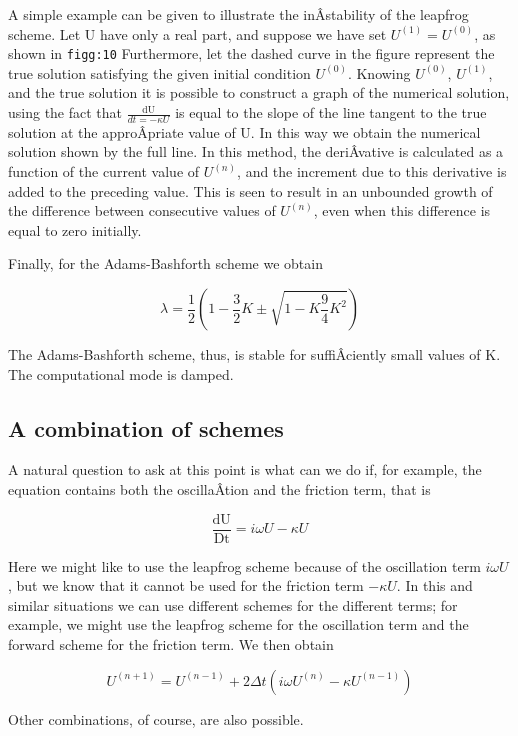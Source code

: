 A simple example can be given to illustrate the inÂ­stability of the
leapfrog scheme. Let U have only a real part, and suppose we have set
\(U^{( 1 )} = U^{( 0 )}\), as shown in \texttt{figg:10} Furthermore, let
the dashed curve in the figure represent the true solution satisfying
the given initial condition \(U^{\left( 0 \right)}\). Knowing
\(U^{\left( 0 \right)}\), \(U^{\left( 1 \right)}\), and the true
solution it is possible to construct a graph of the numerical solution,
using the fact that \(\frac{\text{dU}}{dt = - \kappa U}\) is equal to
the slope of the line tangent to the true solution at the approÂ­priate
value of U. In this way we obtain the numerical solution shown by the
full line. In this method, the deriÂ­vative is calculated as a function
of the current value of \(U^{\left( n \right)}\), and the increment due
to this derivative is added to the preceding value. This is seen to
result in an unbounded growth of the difference between consecutive
values of \(U^{\left( n \right)}\), even when this difference is equal
to zero initially.

\begin{figure}
\centering
{}
\caption{}
\end{figure}

Finally, for the Adams-Bashforth scheme we obtain

{\[\lambda = \frac{1}{2}\left( 1 - \frac{3}{2}K \pm \sqrt{1 - K\frac{9}{4}K^{2}} \right)\]}

The Adams-Bashforth scheme, thus, is stable for suffiÂ­ciently small
values of K. The computational mode is damped.

\subsection{\texorpdfstring{\textbf{A combination of
schemes}}{A combination of schemes}}\label{a-combination-of-schemes}

A natural question to ask at this point is what can we do if, for
example, the equation contains both the oscillaÂ­tion and the friction
term, that is

{\[\frac{\text{dU}}{\text{Dt}} = i\omega U - \kappa U\]}

Here we might like to use the leapfrog scheme because of the oscillation
term \(i\omega U\), but we know that it cannot be used for the friction
term \(- \kappa U\). In this and similar situations we can use different
schemes for the different terms; for example, we might use the leapfrog
scheme for the oscillation term and the forward scheme for the friction
term. We then obtain

\[U^{\left( n + 1 \right)} = U^{\left( n - 1 \right)} + 2\Delta t\left( i\omega U^{\left( n \right)} - \kappa U^{\left( n - 1 \right)} \right)\]

Other combinations, of course, are also possible.